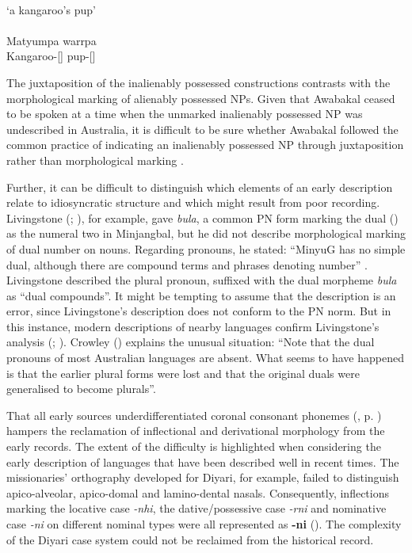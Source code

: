 \ea
{} \\
{`a kangaroo’s pup'}  \\
\glt \citep[8]{roth_ethnological_1897} \\
\gll Matyumpa warrpa\\
Kangaroo-[] pup-[]\\
\z

The juxtaposition of the inalienably possessed constructions contrasts with the morphological marking of alienably possessed NPs. Given that Awabakal ceased to be spoken at a time when the unmarked inalienably possessed NP was undescribed in Australia, it is difficult to be sure whether Awabakal followed the common practice of indicating an inalienably possessed NP through juxtaposition rather than morphological marking \citep[59]{dixon_australian_2002}. 

Further, it can be difficult to distinguish which elements of an early description relate to idiosyncratic structure and which might result from poor recording. Livingstone (\citeyear[8]{dixon_australian_2002}; ), for example, gave \textit{bula}, a common PN form marking the dual (\citealt[116--117]{dixon_australian_2002}) as the numeral two in Minjangbal, but he did not describe morphological marking of dual number on nouns. Regarding pronouns, he stated: “MinyuG has no simple dual, although there are compound terms and phrases denoting number” \citep[6]{dixon_australian_2002}. Livingstone described the plural pronoun, suffixed with the dual morpheme \textit{bula} as ``dual compounds''. It might be tempting to assume that the description is an error, since Livingstone’s description does not conform to the PN norm. But in this instance, modern descriptions of nearby languages confirm Livingstone’s analysis (\citealt[15]{Sharpe_1992}; \citealt[258]{smythe_bandjalang_1978}). Crowley (\citeyear[78]{crowley_middle_1978}) explains the unusual situation: “Note that the dual pronouns of most Australian languages are absent. What seems to have happened is that the earlier plural forms were lost and that the original duals were generalised to become plurals”.

That all early sources underdifferentiated coronal consonant phonemes (, p. \pageref{tab:chap1:consonantphonemes}) hampers the reclamation of inflectional and derivational morphology from the early records. The extent of the difficulty is highlighted when considering the early description of languages that have been described well in recent times. The missionaries' orthography developed for Diyari, for example, failed to distinguish apico-alveolar, apico-domal and lamino-dental nasals. Consequently, inflections marking the locative case \textit{-nhi}, the dative/possessive case \textit{-rni} and nominative case \textit{-ni} on different nominal types were all represented as \textbf{-ni} (). The complexity of the Diyari case system could not be reclaimed from the historical record.

